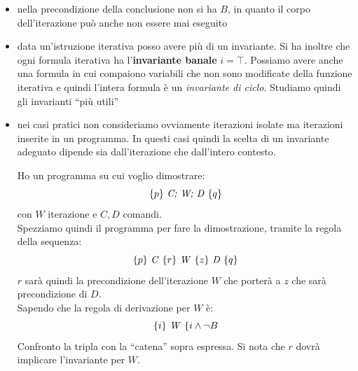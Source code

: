 \documentclass[a4paper,12pt, oneside]{book}
\begin{document}
\begin{definizione}
\begin{itemize}
    \item nella precondizione della conclusione non si ha $B$, in quanto il
    corpo dell'iterazione può anche non essere mai eseguito
    \item data un'istruzione iterativa posso avere più di un invariante. Si ha
    inoltre che ogni formula iterativa ha l'\textbf{invariante banale}
    $i=\top$. Possiamo avere anche una formula in cui compaiono variabili che
    non sono modificate della funzione iterativa e quindi l'intera formula è un
    \textit{invariante di ciclo}. Studiamo quindi gli invarianti ``più utili''
    \item nei casi pratici non consideriamo ovviamente iterazioni isolate ma
    iterazioni inserite in un programma. In questi casi quindi la scelta di un
    invariante adeguato dipende sia dall'iterazione che dall'intero contesto.
    \begin{esempio}
      Ho un programma su cui voglio dimostrare:
      \[\{p\}\mbox{ \textit{C; W; D} }\{q\}\]
      con $W$ iterazione e $C,D$ comandi.\\
      Spezziamo quindi il programma per fare la dimostrazione, tramite la regola
      della sequenza:
      \[\{p\}\mbox{ \textit{C} }\{r\}\mbox{ \textit{W} }\{z\}\mbox{ \textit{D}
        }\{q\}\]
      $r$ sarà quindi la precondizione dell'iterazione $W$ che porterà a $z$ che
      sarà precondizione di $D$.\\
      Sapendo che la regola di derivazione per $W$ è:
      \[\{i\}\mbox{ \textit{W} }\{i\land\neg B\]
      Confronto la tripla con la ``catena'' sopra espressa. Si nota che $r$
      dovrà implicare l'invariante per $W$.
    \end{esempio}
  \end{itemize}
\end{definizione}
\end{document}
